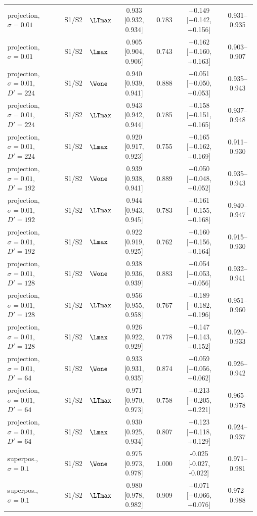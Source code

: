 \begin{table}[p]
\begin{tabular}{lllcccc}
projection, $\sigma{=}0.01$ & S1/S2 & $\LTmax$ & 0.933 [0.932, 0.934] & 0.783 & +0.149 [+0.142, +0.156] & 0.931--0.935 \\
projection, $\sigma{=}0.01$ & S1/S2 & $\Lmax$ & 0.905 [0.904, 0.906] & 0.743 & +0.162 [+0.160, +0.163] & 0.903--0.907 \\
projection, $\sigma{=}0.01$, $D'{=}224$ & S1/S2 & $\Wone$ & 0.940 [0.939, 0.941] & 0.888 & +0.051 [+0.050, +0.053] & 0.935--0.943 \\
projection, $\sigma{=}0.01$, $D'{=}224$ & S1/S2 & $\LTmax$ & 0.943 [0.942, 0.944] & 0.785 & +0.158 [+0.151, +0.165] & 0.937--0.948 \\
projection, $\sigma{=}0.01$, $D'{=}224$ & S1/S2 & $\Lmax$ & 0.920 [0.917, 0.923] & 0.755 & +0.165 [+0.162, +0.169] & 0.911--0.930 \\
projection, $\sigma{=}0.01$, $D'{=}192$ & S1/S2 & $\Wone$ & 0.939 [0.938, 0.941] & 0.889 & +0.050 [+0.048, +0.052] & 0.935--0.943 \\
projection, $\sigma{=}0.01$, $D'{=}192$ & S1/S2 & $\LTmax$ & 0.944 [0.943, 0.945] & 0.783 & +0.161 [+0.155, +0.168] & 0.940--0.947 \\
projection, $\sigma{=}0.01$, $D'{=}192$ & S1/S2 & $\Lmax$ & 0.922 [0.919, 0.925] & 0.762 & +0.160 [+0.156, +0.164] & 0.915--0.930 \\
projection, $\sigma{=}0.01$, $D'{=}128$ & S1/S2 & $\Wone$ & 0.938 [0.936, 0.939] & 0.883 & +0.054 [+0.053, +0.056] & 0.932--0.941 \\
projection, $\sigma{=}0.01$, $D'{=}128$ & S1/S2 & $\LTmax$ & 0.956 [0.955, 0.958] & 0.767 & +0.189 [+0.182, +0.196] & 0.951--0.960 \\
projection, $\sigma{=}0.01$, $D'{=}128$ & S1/S2 & $\Lmax$ & 0.926 [0.922, 0.929] & 0.778 & +0.147 [+0.143, +0.152] & 0.920--0.933 \\
projection, $\sigma{=}0.01$, $D'{=}64$ & S1/S2 & $\Wone$ & 0.933 [0.931, 0.935] & 0.874 & +0.059 [+0.056, +0.062] & 0.926--0.942 \\
projection, $\sigma{=}0.01$, $D'{=}64$ & S1/S2 & $\LTmax$ & 0.971 [0.970, 0.973] & 0.758 & +0.213 [+0.205, +0.221] & 0.965--0.978 \\
projection, $\sigma{=}0.01$, $D'{=}64$ & S1/S2 & $\Lmax$ & 0.930 [0.925, 0.934] & 0.807 & +0.123 [+0.118, +0.129] & 0.924--0.937 \\
superpos., $\sigma{=}0.1$ & S1/S2 & $\Wone$ & 0.975 [0.973, 0.978] & 1.000 & -0.025 [-0.027, -0.022] & 0.971--0.981 \\
superpos., $\sigma{=}0.1$ & S1/S2 & $\LTmax$ & 0.980 [0.978, 0.982] & 0.909 & +0.071 [+0.066, +0.076] & 0.972--0.988 \\

\end{tabular}
\end{table}
